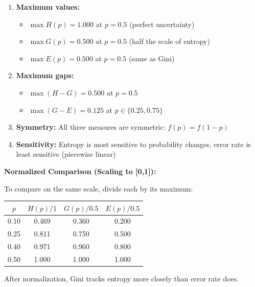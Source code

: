 \documentclass[12pt]{article}
\begin{document}
\begin{solution}
\begin{enumerate}
\item \textbf{Maximum values:}
\begin{itemize}
\item $\max H(p) = 1.000$ at $p = 0.5$ (perfect uncertainty)
\item $\max G(p) = 0.500$ at $p = 0.5$ (half the scale of entropy)
\item $\max E(p) = 0.500$ at $p = 0.5$ (same as Gini)
\end{itemize}

\item \textbf{Maximum gaps:}
\begin{itemize}
\item $\max(H - G) = 0.500$ at $p = 0.5$
\item $\max(G - E) = 0.125$ at $p \in \{0.25, 0.75\}$
\end{itemize}

\item \textbf{Symmetry:} All three measures are symmetric: $f(p) = f(1-p)$

\item \textbf{Sensitivity:} Entropy is most sensitive to probability changes, error rate is least sensitive (piecewise linear)
\end{enumerate}

\textbf{Normalized Comparison (Scaling to [0,1]):}

To compare on the same scale, divide each by its maximum:

\begin{center}
\begin{tabular}{|c|c|c|c|}
\hline
\textbf{$p$} & \textbf{$H(p)/1$} & \textbf{$G(p)/0.5$} & \textbf{$E(p)/0.5$} \\
\hline
0.10 & 0.469 & 0.360 & 0.200 \\
0.25 & 0.811 & 0.750 & 0.500 \\
0.40 & 0.971 & 0.960 & 0.800 \\
0.50 & 1.000 & 1.000 & 1.000 \\
\hline
\end{tabular}
\end{center}

After normalization, Gini tracks entropy more closely than error rate does.
\end{solution}
\end{document}
